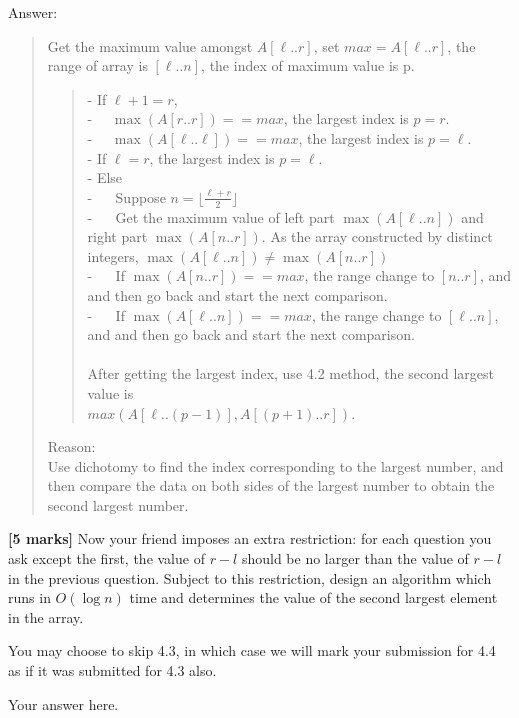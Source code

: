 \documentclass{article}
\begin{document}
\begin{Question}
\begin{Subquestion}
\begin{answer}
Answer:
\begin{quote}
Get the maximum value amongst $A[\ell..r]$, set $max = A[\ell..r]$, the range of array is $[\ell..n]$, the index of maximum value is p.
\begin{quote}
- If $\ell + 1 = r$, \\
- $\quad \max(A[r..r]) == max$, the largest index is $p = r$.\\
- $\quad \max(A[\ell..\ell]) == max$, the largest index is $p = \ell$.\\
- If $\ell = r$, the largest index is $p = \ell$.\\
- Else\\
- $\quad$ Suppose $n = \displaystyle{\lfloor \frac{\ell + r}{2}  \rfloor} $\\
- $\quad$ Get the maximum value of left part $\max(A[\ell..n])$ and right part $\max(A[n..r])$. As the array constructed by distinct integers, $\max(A[\ell..n]) \neq \max(A[n..r])$\\
- $\quad$ If $\max(A[n..r]) == max$, the range change to $[n..r]$, and and then go back and start the next comparison.\\
- $\quad$ If $\max(A[\ell..n]) == max$, the range change to $[\ell..n]$, and and then go back and start the next comparison.\\\\
After getting the largest index, use 4.2 method, the second largest value is \\$max(A[\ell..(p-1)], A[(p+1)..r])$.
\end{quote}
Reason:\\
Use dichotomy to find the index corresponding to the largest number, and then compare the data on both sides of the largest number to obtain the second largest number.\\
\end{quote}
\end{answer}
\end{Subquestion}

\begin{Subquestion}\label{second-largest-ii}
\textbf{[5 marks]} Now your friend imposes an extra restriction: for each question you ask except the first, the value of $r-l$ should be no larger than the value of $r-l$ in the previous question. Subject to this restriction, design an algorithm which runs in $O(\log n)$ time and determines the value of the second largest element in the array.

You may choose to skip 4.3, in which case we will mark your submission for 4.4 as if it was submitted for 4.3 also.

\begin{answer}
Your answer here.
\end{answer}
\end{Subquestion}
\end{Question}
\end{document}
